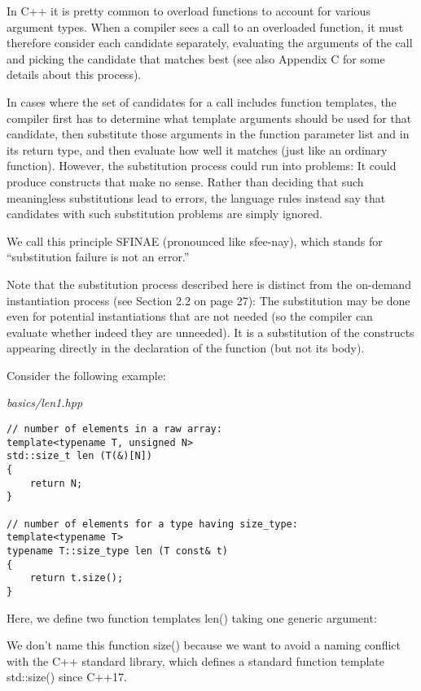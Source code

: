 
In C++ it is pretty common to overload functions to account for various argument types. When a compiler sees a call to an overloaded function, it must therefore consider each candidate separately, evaluating the arguments of the call and picking the candidate that matches best (see also Appendix C for some details about this process).

In cases where the set of candidates for a call includes function templates, the compiler first has to determine what template arguments should be used for that candidate, then substitute those arguments in the function parameter list and in its return type, and then evaluate how well it matches (just like an ordinary function). However, the substitution process could run into problems: It could produce constructs that make no sense. Rather than deciding that such meaningless substitutions lead to errors, the language rules instead say that candidates with such substitution problems are simply ignored. 

We call this principle SFINAE (pronounced like sfee-nay), which stands for “substitution failure is not an error.”

Note that the substitution process described here is distinct from the on-demand instantiation process (see Section 2.2 on page 27): The substitution may be done even for potential instantiations that are not needed (so the compiler can evaluate whether indeed they are unneeded). It is a substitution of the constructs appearing directly in the declaration of the function (but not its body). 

Consider the following example:

\noindent
\textit{basics/len1.hpp}
\begin{lstlisting}[style=styleCXX]
// number of elements in a raw array:
template<typename T, unsigned N>
std::size_t len (T(&)[N])
{
	return N;
}

// number of elements for a type having size_type:
template<typename T>
typename T::size_type len (T const& t)
{
	return t.size();
}
\end{lstlisting}

Here, we define two function templates len() taking one generic argument:

\begin{tcolorbox}[colback=webgreen!5!white,colframe=webgreen!75!black]
\hspace*{0.75cm}We don’t name this function size() because we want to avoid a naming conflict with the C++ standard library, which defines a standard function template std::size() since C++17.
\end{tcolorbox}


